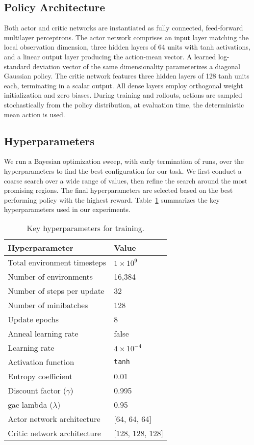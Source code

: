 \subsection{Policy Architecture}
Both actor and critic networks are instantiated as fully connected, feed-forward multilayer perceptrons. The actor network comprises an input layer matching the local observation dimension, three hidden layers of 64 units with tanh activations, and a linear output layer producing the action-mean vector. A learned log-standard deviation vector of the same dimensionality parameterizes a diagonal Gaussian policy. The critic network features three hidden layers of 128 tanh units each, terminating in a scalar output. All dense layers employ orthogonal weight initialization and zero biases. During training and rollouts, actions are sampled stochastically from the policy distribution, at evaluation time, the deterministic mean action is used.

\subsection{Hyperparameters}
We run a Bayesian optimization sweep, with early termination of runs, over the hyperparameters to find the best configuration for our task. We first conduct a coarse search over a wide range of values, then refine the search around the most promising regions. The final hyperparameters are selected based on the best performing policy with the highest reward. Table~\ref{tab:hyperparams} summarizes the key hyperparameters used in our experiments.

\begin{table}[ht]
  \centering
  \caption{Key hyperparameters for training.}
  \label{tab:hyperparams}
  \begin{tabular}{@{}ll@{}}
    \toprule
    Hyperparameter & Value \\
    \midrule
    Total environment timesteps    & $1\times10^{9}$ \\
    Number of environments & 16,384 \\
    Number of steps per update & 32 \\
    Number of minibatches & 128 \\
    Update epochs & 8 \\
    Anneal learning rate & false \\
    Learning rate & $4\times10^{-4}$ \\
    Activation function & \texttt{tanh} \\
    Entropy coefficient & 0.01 \\
    Discount factor ($\gamma$) & 0.995 \\
    \gls{gae} lambda ($\lambda$) & 0.95 \\

    Actor network architecture & [64, 64, 64] \\
    Critic network architecture & [128, 128, 128] \\
    \bottomrule
  \end{tabular}
\end{table}



